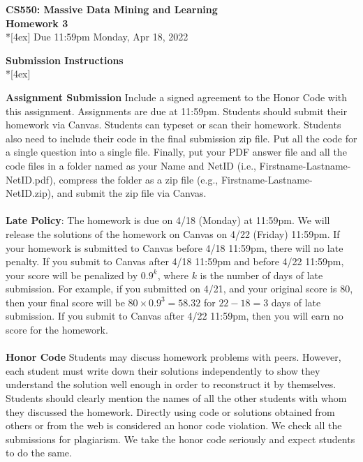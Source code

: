 \documentclass[11pt]{article}
\begin{document}
\thispagestyle{empty}
\parindent 0pt
\vfill
\large

\begin{center}
\LARGE{\bf \textsf{CS550: Massive Data Mining and Learning}}\\ {\bf \textsf{Homework 3}} 
\\*[4ex]
Due 11:59pm Monday, Apr 18, 2022
\end{center}

\pagebreak[4]
\begin{center}
\LARGE{\bf \textsf{Submission Instructions}} \\*[4ex]
\end{center}

\textbf{Assignment Submission } Include a signed agreement to the Honor Code with this assignment. Assignments are due at 11:59pm. Students should submit their homework via Canvas. Students can typeset or scan their homework. Students also need to include their code in the final submission zip file. Put all the code for a single question into a single file. Finally, put your PDF answer file and all the code files in a folder named as your Name and NetID (i.e., Firstname-Lastname-NetID.pdf), compress the folder as a zip file (e.g., Firstname-Lastname-NetID.zip), and submit the zip file via Canvas.
\\
\\
\textbf{Late Policy}: The homework is due on 4/18 (Monday) at 11:59pm. We will release the solutions of the homework on Canvas on 4/22 (Friday) 11:59pm. If your homework is submitted to Canvas before 4/18 11:59pm, there will no late penalty. If you submit to Canvas after 4/18 11:59pm and before 4/22 11:59pm, your score will be penalized by $0.9^k$, where $k$ is the number of days of late submission. For example, if you submitted on 4/21, and your original score is 80, then your final score will be $80\times 0.9^3=58.32$ for $22-18=3$ days of late submission. If you submit to Canvas after 4/22 11:59pm, then you will earn no score for the homework.
\\
\\
\textbf{Honor Code } Students may discuss homework problems with peers. However, each student must write down their solutions independently to show they understand the solution well enough in order to reconstruct it by themselves.  Students should clearly mention the names of all the other students with whom they discussed the homework. Directly using code or solutions obtained from others or from the web is considered an honor code violation. We check all the submissions for plagiarism. We take the honor code seriously and expect students to do the same. 
\end{document}
